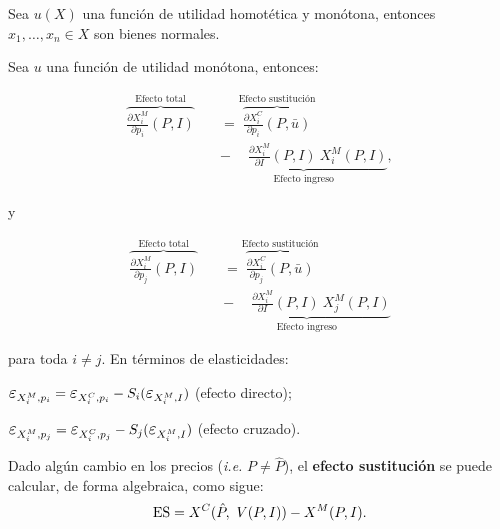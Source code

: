 \documentclass[8pt,a4paper]{extarticle}
\begin{document}
\begin{multicols}{3}
\begin{boxprop}
	Sea $u(X)$ una función de utilidad homotética y monótona, entonces $x_1, \ldots, x_n \in X$ son bienes normales.
\end{boxprop}

\begin{boxtheo}
	Sea $u$ una función de utilidad monótona, entonces:
	
	\begin{equation*}
	\begin{aligned}
		\overbrace{\frac{\partial X^M_i}{\partial p_i} (P, I)}^{\text{Efecto total}} \quad &= \overbrace{\frac{\partial X^C_i}{\partial p_i} (P, \bar{u})}^{\text{Efecto sustitución}} \\
		& \underbrace{ - \quad\ \frac{\partial X_i^M}{\partial I} (P, I)\ X^M_i (P,I)}_{\text{Efecto ingreso}},
	\end{aligned}
	\end{equation*}
	
	y
	
	\begin{equation*}
	\begin{aligned}
		\overbrace{\frac{\partial X^M_i}{\partial p_j} (P, I)}^{\text{Efecto total}} \quad &= \overbrace{\frac{\partial X^C_i}{\partial p_j} (P, \bar{u})}^{\text{Efecto sustitución}} \\
		& \underbrace{ - \quad\ \frac{\partial X_i^M}{\partial I} (P, I)\ X^M_j (P,I)}_{\text{Efecto ingreso}}
	\end{aligned}
	\end{equation*} 

	para toda $i \neq j$. En términos de elasticidades:

	\begin{eqlist}
	\item $\E_{X_i^M, p_i} = \E_{X_i^C, p_i} - S_i ( \E_{X_i^M, I})$ (efecto directo);
	\item $\E_{X_i^M, p_j} = \E_{X_i^C, p_j} - S_j ( \E_{X_i^M, I})$ (efecto cruzado).
	\end{eqlist}

\end{boxtheo}

\begin{boxdef}
	Dado algún cambio en los precios (\emph{i.e.} $P \neq \hat{P}$), el \textbf{efecto sustitución} se puede calcular, de forma algebraica, como sigue:
	\[
	\text{\normalfont ES} = X^C (\hat{P},\ V(P, I)) - X^M(P, I)
	.\] 
\end{boxdef}


\end{multicols}
\end{document}
